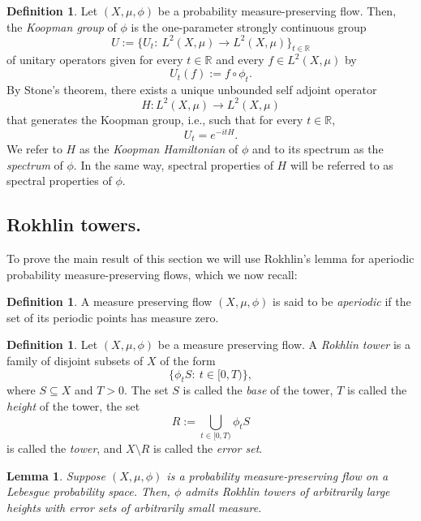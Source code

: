 \documentclass{amsart}
\newtheorem{lemma}[theorem]{Lemma}
\theoremstyle{definition}
\newtheorem{definition}[theorem]{Definition}
\theoremstyle{remark}
\numberwithin{equation}{section}
\newcommand{\<}{{\langle}}
\renewcommand{\>}{{\rangle}}
\begin{document}
\begin{definition}
    Let $(X,\mu,\phi)$ be a probability measure-preserving flow. Then, the \textit{Koopman group} of $\phi$ is the one-parameter strongly continuous group 
    \[
    U := \{U_t \colon \ L^2(X,\mu) \to L^2(X,\mu)\}_{t \in \mathbb{R}}
    \]
    of unitary operators  given for every $t \in \mathbb{R}$ and every $f \in L^2(X,\mu)$ by
    \[
    U_t(f) := f \circ \phi_t.
    \]
    By Stone's theorem, there exists a unique unbounded self adjoint operator 
    \[
    H \colon L^2(X,\mu) \to L^2(X,\mu)
    \]
    that generates the Koopman group, i.e., such that for every $t \in \mathbb{R}$,
    \[
    U_t = e^{-itH}.
    \]
    We refer to $H$ as the \textit{Koopman Hamiltonian} of $\phi$ and to its spectrum as the \textit{spectrum} of $\phi$. In the same way, spectral properties of $H$ will be referred to as spectral properties of $\phi$.
\end{definition}

\subsection{Rokhlin towers.} To prove the main result of this section we will use Rokhlin's lemma for aperiodic probability measure-preserving flows, which we now recall:

\begin{definition}
    A measure preserving flow $(X,\mu,\phi)$ is said to be \textit{aperiodic} if the set of its periodic points has measure zero.
\end{definition}

\begin{definition}
    Let $(X,\mu,\phi)$ be a measure preserving flow. A \textit{Rokhlin tower} is a family of disjoint subsets of $X$ of the form
    \[
    \{\phi_t S \colon \ t \in [0,T)\},
    \]
    where $S \subseteq X$ and $T > 0$.
    The set $S$ is called the \textit{base} of the tower, $T$ is called the \textit{height} of the tower, the set 
    \[
    R := \bigcup_{t \in [0,T)} \phi_t S   
    \]
    is called the \textit{tower}, and $X \setminus R$ is called the \textit{error set}.
\end{definition}

\begin{lemma}
    \label{lem:rokhlin}
    Suppose $(X,\mu,\phi)$ is a probability measure-preserving flow on a Lebesgue probability space. Then, $\phi$ admits  Rokhlin towers of arbitrarily large heights with error sets of arbitrarily small measure.
\end{lemma}
\end{document}
